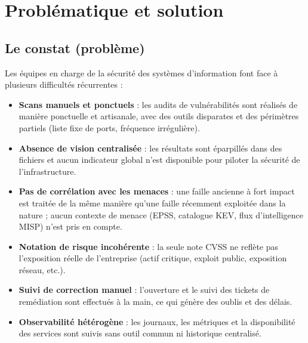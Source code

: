 \documentclass[11pt,a4paper]{article}
\begin{document}
\section{Probl\'ematique et solution}

\subsection{Le constat (probl\`eme)}

Les \'equipes en charge de la s\'ecurit\'e des syst\`emes d'information font
face \`a plusieurs difficult\'es r\'ecurrentes :

\begin{itemize}[leftmargin=1.6em]
  \item \textbf{Scans manuels et ponctuels} : les audits de vuln\'erabilit\'es
        sont r\'ealis\'es de mani\`ere ponctuelle et artisanale, avec des
        outils disparates et des p\'erim\`etres partiels (liste fixe de ports,
        fr\'equence irr\'eguli\`ere).
  \item \textbf{Absence de vision centralis\'ee} : les r\'esultats sont
        \'eparpill\'es dans des fichiers et aucun indicateur global n'est
        disponible pour piloter la s\'ecurit\'e de l'infrastructure.
  \item \textbf{Pas de corr\'elation avec les menaces} : une faille ancienne
        \`a fort impact est trait\'ee de la m\^eme mani\`ere qu'une faille
        r\'ecemment exploit\'ee dans la nature ; aucun contexte de menace
        (EPSS, catalogue KEV, flux d'intelligence MISP) n'est pris en compte.
  \item \textbf{Notation de risque incoh\'erente} : la seule note CVSS ne
        refl\`ete pas l'exposition r\'eelle de l'entreprise (actif critique,
        exploit public, exposition r\'eseau, etc.).
  \item \textbf{Suivi de correction manuel} : l'ouverture et le suivi des
        tickets de rem\'ediation sont effectu\'es \`a la main, ce qui
        g\'en\`ere des oublis et des d\'elais.
  \item \textbf{Observabilit\'e h\'et\'erog\`ene} : les journaux, les
        m\'etriques et la disponibilit\'e des services sont suivis sans outil
        commun ni historique centralis\'e.
\end{itemize}
\end{document}
